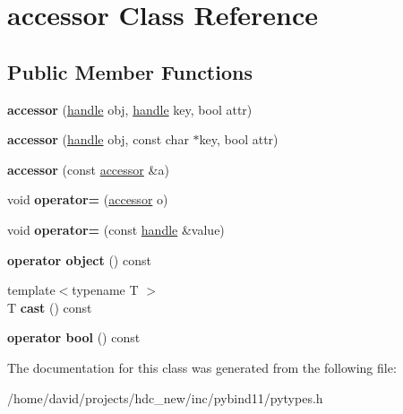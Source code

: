 \hypertarget{classaccessor}{}\section{accessor Class Reference}
\label{classaccessor}
\subsection*{Public Member Functions}
\begin{DoxyCompactItemize}
\item 
{\bfseries accessor} (\hyperlink{classhandle}{handle} obj, \hyperlink{classhandle}{handle} key, bool attr)\hypertarget{classaccessor_a313cc07ff09afad93164913c5a8100a6}{}\label{classaccessor_a313cc07ff09afad93164913c5a8100a6}

\item 
{\bfseries accessor} (\hyperlink{classhandle}{handle} obj, const char $\ast$key, bool attr)\hypertarget{classaccessor_aa4a6d77fac3bb99762648da14d937908}{}\label{classaccessor_aa4a6d77fac3bb99762648da14d937908}

\item 
{\bfseries accessor} (const \hyperlink{classaccessor}{accessor} \&a)\hypertarget{classaccessor_a5e6c508300da1a9da52d621b3134f734}{}\label{classaccessor_a5e6c508300da1a9da52d621b3134f734}

\item 
void {\bfseries operator=} (\hyperlink{classaccessor}{accessor} o)\hypertarget{classaccessor_ad0c11a839ee53836ca9e3cc0dd900e55}{}\label{classaccessor_ad0c11a839ee53836ca9e3cc0dd900e55}

\item 
void {\bfseries operator=} (const \hyperlink{classhandle}{handle} \&value)\hypertarget{classaccessor_a0171d067f062721b5509419fd8a3d54f}{}\label{classaccessor_a0171d067f062721b5509419fd8a3d54f}

\item 
{\bfseries operator object} () const \hypertarget{classaccessor_ae8bd6ca518e2a01dc6ce6974f070e8cf}{}\label{classaccessor_ae8bd6ca518e2a01dc6ce6974f070e8cf}

\item 
{\footnotesize template$<$typename T $>$ }\\T {\bfseries cast} () const \hypertarget{classaccessor_a7430c642e8ebe566fdcdc41f7591e367}{}\label{classaccessor_a7430c642e8ebe566fdcdc41f7591e367}

\item 
{\bfseries operator bool} () const \hypertarget{classaccessor_a15f6a5ce0f5c4951de56a97c53aace1e}{}\label{classaccessor_a15f6a5ce0f5c4951de56a97c53aace1e}

\end{DoxyCompactItemize}


The documentation for this class was generated from the following file\+:\begin{DoxyCompactItemize}
\item 
/home/david/projects/hdc\+\_\+new/inc/pybind11/pytypes.\+h\end{DoxyCompactItemize}
